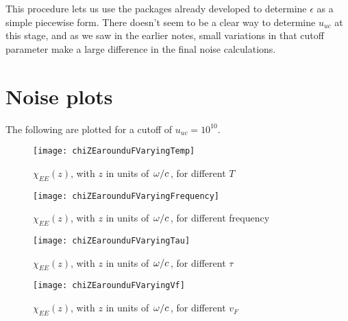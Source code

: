 \documentclass[../main.tex]{subfiles}
\begin{document}
	This procedure lets us use the packages already developed to determine $\epsilon$ as a simple piecewise form.
	There doesn't seem to be a clear way to determine $u_{uc}$ at this stage, and as we saw in the earlier notes, small variations in that cutoff parameter make a large difference in the final noise calculations.

	\section{Noise plots} \label{sec:plotsine}

	The following are plotted for a cutoff of $u_{uc} = 10^{10}$.

	\begin{figure}[htp]
		\centering
		\texttt{[image: chiZEarounduFVaryingTemp]}
		\caption{$\chi_{EE}(z)$, with $z$ in units of $\flatfrac{\omega}{c}$, for different $T$} \label{fig:ine:temp}
	\end{figure}

	\begin{figure}[htp]
		\centering
		\texttt{[image: chiZEarounduFVaryingFrequency]}
		\caption{$\chi_{EE}(z)$, with $z$ in units of $\flatfrac{\omega}{c}$, for different frequency} \label{fig:ine:frequency}
	\end{figure}

	\begin{figure}[htp]
		\centering
		\texttt{[image: chiZEarounduFVaryingTau]}
		\caption{$\chi_{EE}(z)$, with $z$ in units of $\flatfrac{\omega}{c}$, for different $\tau$} \label{fig:ine:tau}
	\end{figure}

	\begin{figure}[htp]
		\centering
		\texttt{[image: chiZEarounduFVaryingVf]}
		\caption{$\chi_{EE}(z)$, with $z$ in units of $\flatfrac{\omega}{c}$, for different $v_F$} \label{fig:ine:vf}
	\end{figure}
\end{document}
